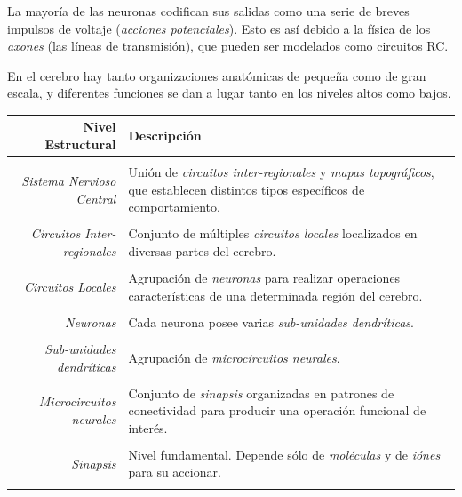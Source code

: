 \documentclass[10pt,a4paper]{article}
\begin{document}
La mayoría de las neuronas codifican sus salidas como una serie de breves impulsos de voltaje (\textit{acciones potenciales}). Esto es así debido a la física de los \textit{axones} (las líneas de transmisión), que pueden ser modelados como circuitos RC.

En el cerebro hay tanto organizaciones anatómicas de pequeña como de gran escala, y diferentes funciones se dan a lugar tanto en los niveles altos como bajos.

\begin{tabular}{rp{11.3cm}}
{\bf Nivel Estructural} & {\bf Descripción} \\\hline \\ [-1.5ex]
{\textit{Sistema Nervioso Central}}
& Unión de \textit{circuitos inter-regionales} y \textit{mapas topográficos}, que establecen distintos tipos específicos de comportamiento.
\\ [1ex] \hline \\ [-1.5ex]
{\textit{Circuitos Inter-regionales}}
& Conjunto de múltiples \textit{circuitos locales} localizados en diversas partes del cerebro.
\\ [1ex] \hline \\ [-1.5ex]
{\textit{Circuitos Locales}}
& Agrupación de \textit{neuronas} para realizar operaciones características de una determinada región del cerebro.
\\ [1ex] \hline \\ [-1.5ex]
{\textit{Neuronas}}
& Cada neurona posee varias \textit{sub-unidades dendríticas}.
\\ [1ex] \hline \\ [-1.5ex]
{\textit{Sub-unidades dendríticas}}
& Agrupación de \textit{microcircuitos neurales}.
\\ [1ex] \hline \\ [-1.5ex]
{\textit{Microcircuitos neurales}}
& Conjunto de \textit{sinapsis} organizadas en patrones de conectividad para producir una operación funcional de interés.
\\ [1ex] \hline \\ [-1.5ex]
{\textit{Sinapsis}}
& Nivel fundamental. Depende sólo de \textit{moléculas} y de \textit{iónes} para su accionar.
\\ [1ex] \hline \\ [-1.5ex]
\end{tabular}
\end{document}
